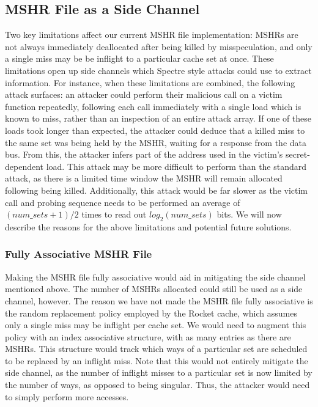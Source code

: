 \subsection{MSHR File as a Side Channel} \label{specbuf_sidechannel}
Two key limitations affect our current MSHR file implementation: MSHRs are not always immediately deallocated after being killed by misspeculation, and only a single miss may be be inflight to a particular cache set at once. These limitations open up side channels which Spectre style attacks could use to extract information. For instance, when these limitations are combined, the following attack surfaces: an attacker could perform their malicious call on a victim function repeatedly, following each call immediately with a single load which is known to miss, rather than an inspection of an entire attack array. If one of these loads took longer than expected, the attacker could deduce that a killed miss to the same set was being held by the MSHR, waiting for a response from the data bus. From this, the attacker infers part of the address used in the victim's secret-dependent load. This attack may be more difficult to perform than the standard attack, as there is a limited time window the MSHR will remain allocated following being killed. Additionally, this attack would be far slower as the victim call and probing sequence needs to be performed an average of $(num\_sets+1)/2$ times to read out $log_{2}(num\_sets)$ bits. We will now describe the reasons for the above limitations and potential future solutions.

\subsubsection{Fully Associative MSHR File}
Making the MSHR file fully associative would aid in mitigating the side channel mentioned above. The number of MSHRs allocated could still be used as a side channel, however. The reason we have not made the MSHR file fully associative is the random replacement policy employed by the Rocket cache, which assumes only a single miss may be inflight per cache set. We would need to augment this policy with an index associative structure, with as many entries as there are MSHRs. This structure would track which ways of a particular set are scheduled to be replaced by an inflight miss. Note that this would not entirely mitigate the side channel, as the number of inflight misses to a particular set is now limited by the number of ways, as opposed to being singular. Thus, the attacker would need to simply perform more accesses.

